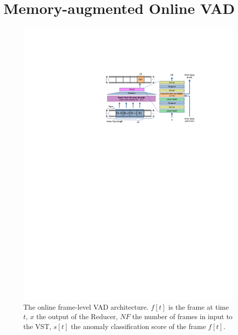\section{Memory-augmented Online VAD}
\label{sec:theory}

\fboxsep=1mm%
\fboxrule=1pt%


\begin{figure}[!t]
            \centerline{\includegraphics[clip, trim=236 510 113 133, width=\linewidth]{images/arch-rx.pdf}}
        \caption{The online frame-level VAD architecture. $f[t]$ is the frame at time $t$, $x$ the output of the Reducer, $\mathit{NF}$ the number of frames in input to the VST, $s[t]$ the anomaly classification score of the frame $f[t]$.\label{fig:arch}}
\end{figure}


